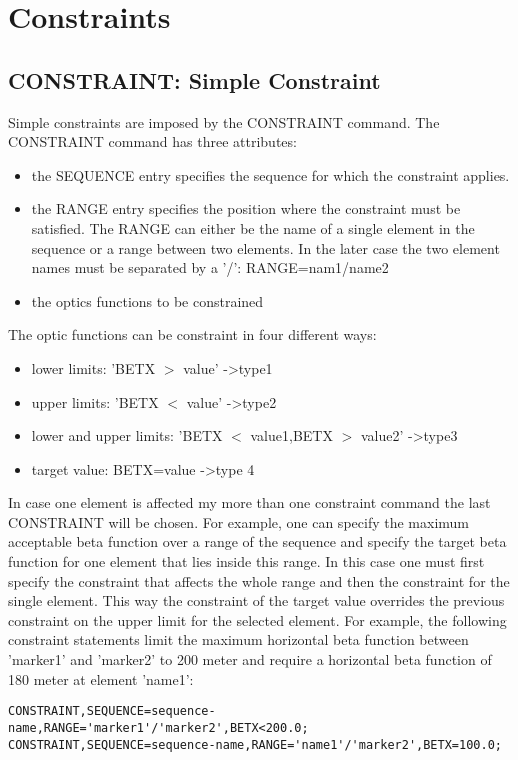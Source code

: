 
\section{Constraints}

\subsection{CONSTRAINT: Simple Constraint}

Simple constraints are imposed by the CONSTRAINT command. The CONSTRAINT command has three attributes:  
\begin{itemize}
	\item  the SEQUENCE entry specifies the sequence for which the constraint applies. 
	\item  the RANGE entry specifies the position where the constraint must be satisfied. The RANGE can either be the name of a single element in the sequence or a range between two elements. In the later case the two element names must be separated by a '/': RANGE=nam1/name2 
	\item the optics functions to be constrained 
\end{itemize} 

The optic functions can be constraint in four different ways: 
\begin{itemize}
	\item lower limits: 'BETX $>$ value' -\textgreater type1 
	\item upper limits: 'BETX $<$ value' -\textgreater type2 
	\item lower and upper limits: 'BETX $<$ value1,BETX $>$ value2' -\textgreater type3 
	\item target value: BETX=value -\textgreater type 4 
\end{itemize} 

In case one element is affected my more than one constraint command the last  CONSTRAINT will be chosen. For example, one can specify the maximum acceptable beta function over a range of the sequence and specify the target beta  function for one element that lies inside this range. In this case one must first specify the constraint that affects the whole range and then the constraint for the single element. This way the constraint of the target value overrides the previous constraint on the upper limit for the selected element. For example, the following constraint statements limit the maximum horizontal beta function between 'marker1' and 'marker2' to 200 meter and require a horizontal beta function of 180 meter at element 'name1': 
\begin{verbatim}
CONSTRAINT,SEQUENCE=sequence-name,RANGE='marker1'/'marker2',BETX<200.0;
CONSTRAINT,SEQUENCE=sequence-name,RANGE='name1'/'marker2',BETX=100.0;
\end{verbatim}

